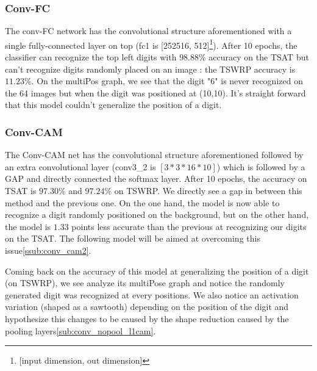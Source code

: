			\subsubsection{Conv-FC} 
			\label{ssub:conv_fc}
				The conv-FC network has the convolutional structure aforementioned with a single fully-connected layer on top (fc1 is [252516, 512]\footnote{[input dimension, out dimension]}).
				After 10 epochs, the classifier can recognize the top left digits with $98.88\%$ accuracy on the TSAT but can't recognize digits randomly placed on an image : the TSWRP accuracy is $11.23\%$. On the multiPos graph, we see that the digit "6" is never recognized on the 64 images but when the digit was positioned at (10,10).
				It's straight forward that this model couldn't generalize the position of a digit.

			\subsubsection{Conv-CAM}
			\label{ssub:conv_cam}
				The Conv-CAM net has the convolutional structure aforementioned followed by an extra convolutional layer (conv3\_2 is $[3*3*16*10]$) which is followed by a GAP and directly connected the softmax layer.
				After 10 epochs, the accuracy on TSAT is $97.30\%$ and $97.24\%$ on TSWRP. We directly see a gap in between this method and the previous one. On the one hand, the model is now able to recognize a digit randomly positioned on the background, but on the other hand, the model is $1.33$ points less accurate than the previous at recognizing our digits on the TSAT. The following model will be aimed at overcoming this issue\ref{ssub:conv_cam2}.

				Coming back on the accuracy of this model at generalizing the position of a digit (on TSWRP), we see analyze its multiPose graph  and notice the randomly generated digit was recognized at every positions. We also notice an activation variation (shaped as a sawtooth) depending on the position of the digit and hypothesize this changes to be caused by the shape reduction caused by the pooling layers\ref{sub:conv_nopool_l1cam}.

